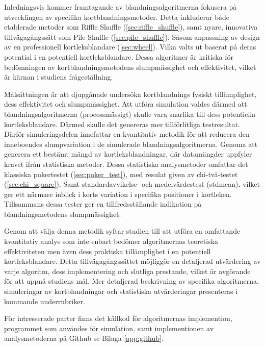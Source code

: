 \documentclass[swedish,a4paper]{article}
\begin{document}
Inledningsvis kommer framtagande av blandningsalgoritmerna fokusera på
utvecklingen av specifika kortblandningsmetoder. Detta inkluderar både
etablerade metoder som Riffle Shuffle (\ref{sec:riffle_shuffle}), samt nyare,
innovativa tillvägagångssätt som Pile Shuffle (\ref{sec:pile_shuffle}). Såsom
anpassning av design av en professionell kortleksblandare (\ref{sec:wheel}).
Vilka valts ut baserat på deras potential i en potentiell kortleksblandare.
Dessa algoritmer är kritiska för bedömningen av kortblandningsmotodens
slumpmässighet och effektivitet, vilket är kärnan i studiens frågeställning. 

Målsättningen är att djupgånade undersöka kortblandnings
fysiskt tillämplighet, dess effektivitet och slumpmässighet. Att utföra 
simulation valdes därmed att blandningsalgoritmerna
(processmässigt) skulle vara snarlika till dess potentiella kortleks\-blandare.
Därmed skulle det genereras mer tillförlitliga testresultat. Därför simuleringsdelen
innefattar en kvantitativ metodik för att reducera den inneboendes
slumpvariation i de simulerade blandningsalgoritmerna. Genoma att generera ett bestämt
mängd av kortleksblandningar, där datamängder uppfyler kravet ifrån statistiska metoder. Dessa
statistiska  analysmetoder omfattar det klassiska pokertestet (\ref{sec:poker_test}), med
resulat given av chi-två-testet (\ref{sec:chi_square}). Samt standardavvikelse- och medelvärdestest (\gls{stdmean}), vilket ger ett närmare inblick i korts variation i specifika
positioner i kortleken. Tillsammans dessa tester ger en tillfredsställande indikation på
blandningsmetodens slumpmässighet. 

Genom att välja denna metodik syftar studien till att utföra en omfattande
kvantitativ analys som inte enbart bedömer algoritmernas teoretiska
effektiviteten men även dess praktiska tillämplighet i en potentiell kortleks\-blandare.
Detta tillvägagångssättet möjliggör en detaljerad utvärdering av varje algoritm,
dess implementering och slutliga prestande, vilket är avgörande för att uppnå
studiens mål. Mer detaljerad beskrivning av specifika algoritmerna,
simuleringar av kortblandningar och statistiska utvärderingar presenteras i kommande 
underrubriker. 

För intresserade parter finns det källkod för algoritmernas implemention,
programmet som användes för simulation, samt implementionen av analysmetoderna
på Github se Bilaga \ref{app:github}.
\end{document}
